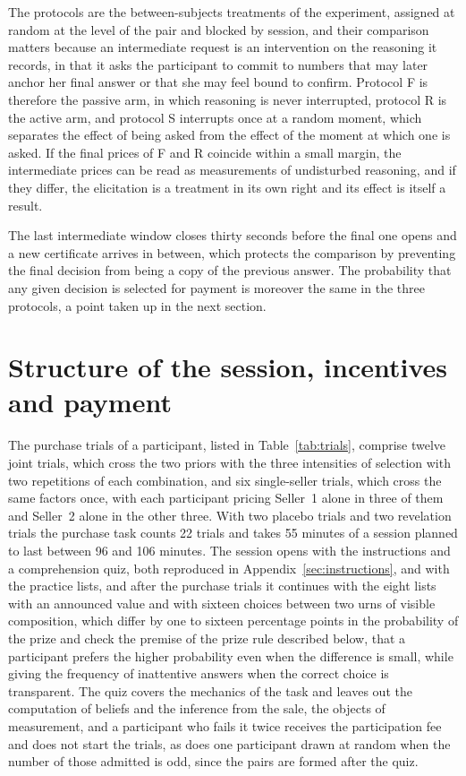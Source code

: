 \documentclass[11pt,a4paper]{article}
\newcommand{\prot}[1]{\textsf{#1}}
\begin{document}
The protocols are the between-subjects treatments of the experiment, assigned at random at the level of the pair and blocked by session, and their comparison matters because an intermediate request is an intervention on the reasoning it records, in that it asks the participant to commit to numbers that may later anchor her final answer or that she may feel bound to confirm. Protocol \prot{F} is therefore the passive arm, in which reasoning is never interrupted, protocol \prot{R} is the active arm, and protocol \prot{S} interrupts once at a random moment, which separates the effect of being asked from the effect of the moment at which one is asked. If the final prices of \prot{F} and \prot{R} coincide within a small margin, the intermediate prices can be read as measurements of undisturbed reasoning, and if they differ, the elicitation is a treatment in its own right and its effect is itself a result.

The last intermediate window closes thirty seconds before the final one opens and a new certificate arrives in between, which protects the comparison by preventing the final decision from being a copy of the previous answer. The probability that any given decision is selected for payment is moreover the same in the three protocols, a point taken up in the next section.

\section{Structure of the session, incentives and payment}\label{sec:session}

The purchase trials of a participant, listed in Table~\ref{tab:trials}, comprise twelve joint trials, which cross the two priors with the three intensities of selection with two repetitions of each combination, and six single-seller trials, which cross the same factors once, with each participant pricing Seller~1 alone in three of them and Seller~2 alone in the other three. With two placebo trials and two revelation trials the purchase task counts 22 trials and takes 55 minutes of a session planned to last between 96 and 106 minutes. The session opens with the instructions and a comprehension quiz, both reproduced in Appendix~\ref{sec:instructions}, and with the practice lists, and after the purchase trials it continues with the eight lists with an announced value and with sixteen choices between two urns of visible composition, which differ by one to sixteen percentage points in the probability of the prize and check the premise of the prize rule described below, that a participant prefers the higher probability even when the difference is small, while giving the frequency of inattentive answers when the correct choice is transparent. The quiz covers the mechanics of the task and leaves out the computation of beliefs and the inference from the sale, the objects of measurement, and a participant who fails it twice receives the participation fee and does not start the trials, as does one participant drawn at random when the number of those admitted is odd, since the pairs are formed after the quiz.
\end{document}
